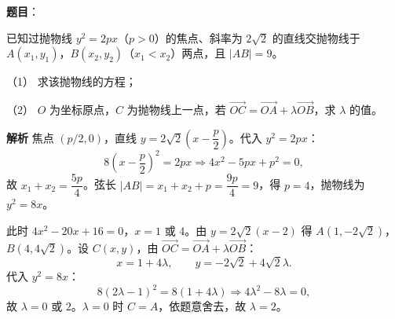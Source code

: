 \begin{answer}

\textbf{题目}：

已知过抛物线 $y^2=2px$（$p>0$）的焦点、斜率为 $2\sqrt2$ 的直线交抛物线于 $A(x_1,y_1)$，$B(x_2,y_2)$（$x_1<x_2$）两点，且 $|AB|=9$。

（1） 求该抛物线的方程；

（2） $O$ 为坐标原点，$C$ 为抛物线上一点，若 $\overrightarrow{OC}=\overrightarrow{OA}+\lambda\overrightarrow{OB}$，求 $\lambda$ 的值。

\textbf{解析}
焦点 $(p/2,0)$，直线 $y=2\sqrt2\left(x-\dfrac p2\right)$。代入 $y^2=2px$：
\nopagebreak[4]
\[8\left(x-\frac p2\right)^2=2px\Longrightarrow4x^2-5px+p^2=0,\]
故 $x_1+x_2=\dfrac{5p}4$。弦长 $|AB|=x_1+x_2+p=\dfrac{9p}4=9$，得 $p=4$，抛物线为 $y^2=8x$。

此时 $4x^2-20x+16=0$，$x=1$ 或 $4$。由 $y=2\sqrt2(x-2)$ 得 $A(1,-2\sqrt2)$，$B(4,4\sqrt2)$。设 $C(x,y)$，由 $\overrightarrow{OC}=\overrightarrow{OA}+\lambda\overrightarrow{OB}$：
\nopagebreak[4]
\[x=1+4\lambda,\qquad y=-2\sqrt2+4\sqrt2\lambda.\]
代入 $y^2=8x$：
\nopagebreak[4]
\[8(2\lambda-1)^2=8(1+4\lambda)\Longrightarrow4\lambda^2-8\lambda=0,\]
故 $\lambda=0$ 或 $2$。$\lambda=0$ 时 $C=A$，依题意舍去，故 $\lambda=2$。



\end{answer}
